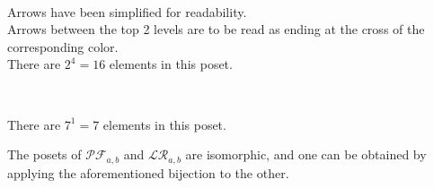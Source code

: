 \begin{example}
    ~\\
    \begin{center}
        
        Arrows have been simplified for readability.\\
        Arrows between the top 2 levels are to be read
        as ending at the cross of the corresponding color.\\
        There are $2^4 = 16$ elements in this poset.
    \end{center}
\end{example}

\begin{example}
    ~\\
    \begin{center}
        
        There are $7^1 = 7$ elements in this poset.
    \end{center}
\end{example}

\begin{rem}
    The posets of $\mathcal{PF}_{a,b}$ and $\mathcal{LR}_{a,b}$
    are isomorphic, and one can be obtained by
    applying the aforementioned bijection to the other.
\end{rem}